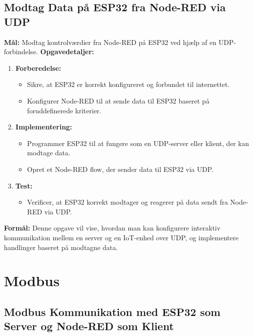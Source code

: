 \subsection*{Modtag Data på ESP32 fra Node-RED via UDP}
\textbf{Mål:} Modtag kontrolværdier fra Node-RED på ESP32 ved hjælp af en UDP-forbindelse.
\newline\newline\noindent
\textbf{Opgavedetaljer:}
\begin{enumerate}
	\item \textbf{Forberedelse:}
	\begin{itemize}
		\item Sikre, at ESP32 er korrekt konfigureret og forbundet til internettet.
		\item Konfigurer Node-RED til at sende data til ESP32 baseret på foruddefinerede kriterier.
	\end{itemize}
	\item \textbf{Implementering:}
	\begin{itemize}
		\item Programmer ESP32 til at fungere som en UDP-server eller klient, der kan modtage data.
		\item Opret et Node-RED flow, der sender data til ESP32 via UDP.
	\end{itemize}
	\item \textbf{Test:}
	\begin{itemize}
		\item Verificer, at ESP32 korrekt modtager og reagerer på data sendt fra Node-RED via UDP.
	\end{itemize}
\end{enumerate}
\textbf{Formål:} Denne opgave vil vise, hvordan man kan konfigurere interaktiv kommunikation mellem en server og en IoT-enhed over UDP, og implementere handlinger baseret på modtagne data.

\section{Modbus}
\subsection*{Modbus Kommunikation med ESP32 som Server og Node-RED som Klient}
